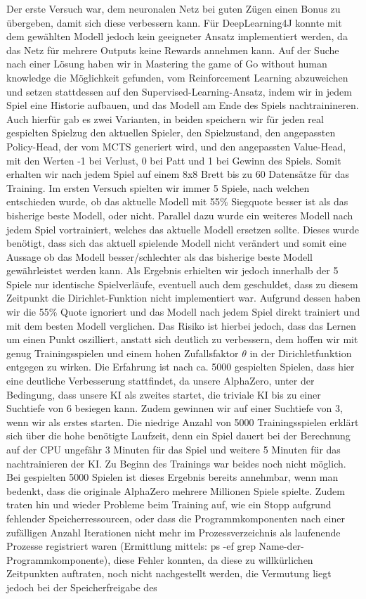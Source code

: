 \documentclass[12pt,a4paper]{article}
\begin{document}
Der erste Versuch war, dem neuronalen Netz bei guten Zügen einen Bonus zu übergeben, damit sich diese verbessern kann. Für DeepLearning4J konnte mit dem gewählten Modell jedoch kein geeigneter Ansatz implementiert werden, da das Netz für mehrere Outputs keine Rewards annehmen kann. Auf der Suche nach einer Lösung haben wir in \glqq Mastering the game of Go without human knowledge\grqq{} \cite{Silver2017} die Möglichkeit gefunden, vom Reinforcement Learning abzuweichen und setzen stattdessen auf den Supervised-Learning-Ansatz, indem wir in jedem Spiel eine Historie aufbauen, und das Modell am Ende des Spiels nachtrainineren. Auch hierfür gab es zwei Varianten, in beiden speichern wir für jeden real gespielten Spielzug den aktuellen Spieler, den Spielzustand, den angepassten Policy-Head, der vom MCTS generiert wird, und den angepassten Value-Head, mit den Werten -1 bei Verlust, 0 bei Patt und 1 bei Gewinn des Spiels. Somit erhalten wir nach jedem Spiel auf einem 8x8 Brett bis zu 60 Datensätze für das Training. Im ersten Versuch spielten wir immer 5 Spiele, nach welchen entschieden wurde, ob das aktuelle Modell mit 55\% Siegquote besser ist als das bisherige beste Modell, oder nicht. Parallel dazu wurde ein weiteres Modell nach jedem Spiel vortrainiert, welches das aktuelle Modell ersetzen sollte. Dieses wurde benötigt, dass sich das aktuell spielende Modell nicht verändert und somit eine Aussage ob das Modell besser/schlechter als das bisherige beste Modell gewährleistet werden kann. Als Ergebnis erhielten wir jedoch innerhalb der 5 Spiele nur identische Spielverläufe, eventuell auch dem geschuldet, dass zu diesem Zeitpunkt die Dirichlet-Funktion nicht implementiert war. Aufgrund dessen haben wir die 55\% Quote ignoriert und das Modell nach jedem Spiel direkt trainiert und mit dem besten Modell verglichen. Das Risiko ist hierbei jedoch, dass das Lernen um einen Punkt oszilliert, anstatt sich deutlich zu verbessern, dem hoffen wir mit genug Trainingsspielen und einem hohen Zufallsfaktor $\theta$ in der Dirichletfunktion entgegen zu wirken. Die Erfahrung ist nach ca. 5000 gespielten Spielen, dass hier eine deutliche Verbesserung stattfindet, da unsere AlphaZero, unter der Bedingung, dass unsere KI als zweites startet, die triviale KI bis zu einer Suchtiefe von 6 besiegen kann. Zudem gewinnen wir auf einer Suchtiefe von 3, wenn wir als erstes starten. Die niedrige Anzahl von 5000 Trainingsspielen erklärt sich über die hohe benötigte Laufzeit, denn ein Spiel dauert bei der Berechnung auf der CPU ungefähr 3 Minuten für das Spiel und weitere 5 Minuten für das nachtrainieren der KI. Zu Beginn des Trainings war beides noch nicht möglich. Bei gespielten 5000 Spielen ist dieses Ergebnis bereits annehmbar, wenn man bedenkt, dass die originale AlphaZero mehrere Millionen Spiele spielte. Zudem traten hin und wieder Probleme beim Training auf, wie ein Stopp aufgrund fehlender Speicherressourcen, oder dass die Programmkomponenten nach einer zufälligen Anzahl Iterationen nicht mehr im Prozessverzeichnis als laufenende Prozesse registriert waren (Ermittlung mittels: ps -ef\:  \textbar\: grep \glqq Name-der-Programmkomponente\grqq{}), diese Fehler konnten, da diese zu willkürlichen Zeitpunkten auftraten, noch nicht nachgestellt werden, die Vermutung liegt jedoch bei der Speicherfreigabe des 
\end{document}
